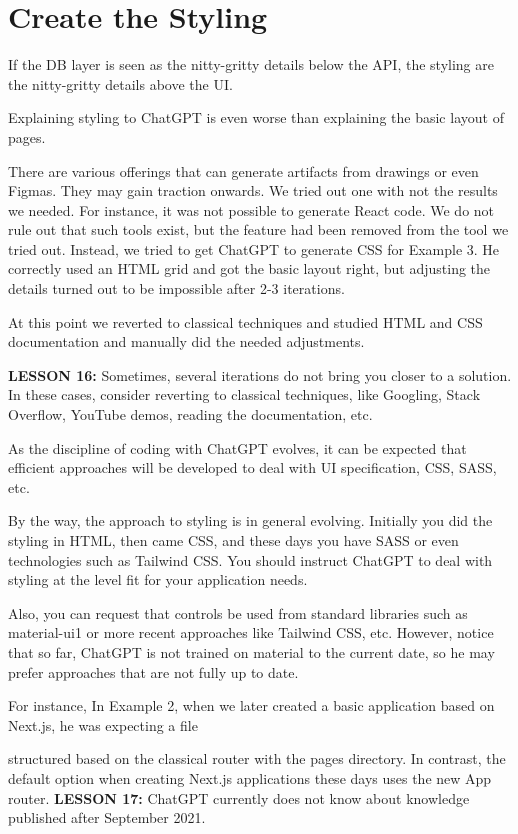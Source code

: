 \documentclass[runningheads]{llncs}
\begin{document}
\section{Create the Styling}
If the DB layer is seen as the nitty-gritty details below the API, the styling are the nitty-gritty details above the UI.

Explaining styling to ChatGPT is even worse than explaining the basic layout of pages.

There are various offerings that can generate artifacts from drawings or even Figmas. They may gain traction onwards. We tried out one with not the results we needed. For instance, it was not possible to generate React code. We do not rule out that such tools exist, but the feature had been removed from the tool we tried out.
Instead, we tried to get ChatGPT to generate CSS for Example 3. He correctly used an HTML grid and got the basic layout right, but adjusting the details turned out to be 
impossible after 2-3 iterations.

At this point we reverted to classical techniques and studied HTML and CSS documentation and manually did the needed adjustments.

\textbf{LESSON 16:} Sometimes, several iterations do not bring you closer to a solution. In these cases, consider reverting to classical techniques, like Googling, Stack Overflow, YouTube demos, reading the documentation, etc.

As the discipline of coding with ChatGPT evolves, it can be expected that efficient approaches will be developed to deal with UI specification, CSS, SASS, etc.

By the way, the approach to styling is in general evolving. Initially you did the styling in HTML, then came CSS, and these days you have SASS or even technologies such as Tailwind CSS. You should instruct ChatGPT to deal with styling at the level fit for your application needs.

Also, you can request that controls be used from standard libraries such as material-ui1 or more recent approaches like Tailwind CSS, etc. However, notice that so far, ChatGPT is not trained on material to the current date, so he may prefer approaches that are not fully up to date.

For instance, In Example 2, when we later created a basic application based on Next.js, he was expecting a file
 
structured based on the classical router with the pages directory. In contrast, the default option when creating Next.js applications these days uses the new App router.
\textbf{LESSON 17:} ChatGPT currently does not know about knowledge published after September 2021.
\end{document}
